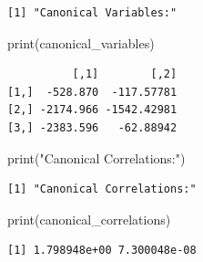 \documentclass[
  letterpaper,
  DIV=11,
  numbers=noendperiod]{scrartcl}
\newenvironment{Shaded}{}{}
\newcommand{\CommentTok}[1]{\textcolor[rgb]{0.57,0.51,0.45}{#1}}
\newcommand{\FunctionTok}[1]{\textcolor[rgb]{0.41,0.62,0.42}{#1}}
\newcommand{\NormalTok}[1]{\textcolor[rgb]{0.24,0.22,0.21}{#1}}
\newcommand{\OtherTok}[1]{\textcolor[rgb]{0.41,0.62,0.42}{#1}}
\newcommand{\SpecialCharTok}[1]{\textcolor[rgb]{0.69,0.38,0.53}{#1}}
\newcommand{\StringTok}[1]{\textcolor[rgb]{0.60,0.59,0.10}{#1}}
\begin{document}
\begin{Shaded}
\end{Shaded}

\begin{verbatim}
[1] "Canonical Variables:"
\end{verbatim}

\begin{Shaded}
\begin{Highlighting}[]
\FunctionTok{print}\NormalTok{(canonical\_variables)}
\end{Highlighting}
\end{Shaded}

\begin{verbatim}
          [,1]        [,2]
[1,]  -528.870  -117.57781
[2,] -2174.966 -1542.42981
[3,] -2383.596   -62.88942
\end{verbatim}

\begin{Shaded}
\begin{Highlighting}[]
\FunctionTok{print}\NormalTok{(}\StringTok{"Canonical Correlations:"}\NormalTok{)}
\end{Highlighting}
\end{Shaded}

\begin{verbatim}
[1] "Canonical Correlations:"
\end{verbatim}

\begin{Shaded}
\begin{Highlighting}[]
\FunctionTok{print}\NormalTok{(canonical\_correlations)}
\end{Highlighting}
\end{Shaded}

\begin{verbatim}
[1] 1.798948e+00 7.300048e-08
\end{verbatim}

\newpage{}
\end{document}

